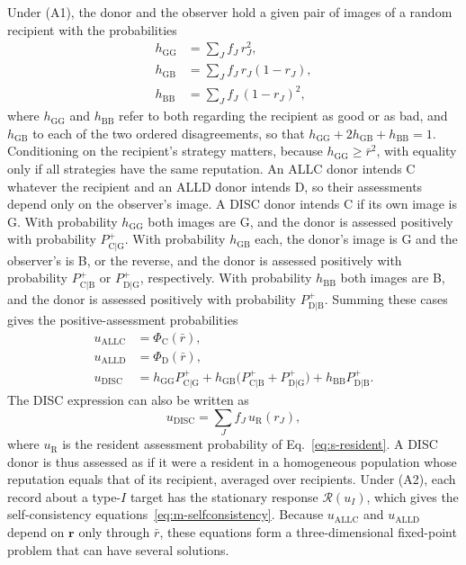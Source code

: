 \documentclass[10pt]{wlscirep}
\newcommand{\Rmap}{\mathscr{R}}            %
\newcommand{\Pp}[1]{P^{+}_{\mathrm{#1}}}   %
\newcommand{\PhiC}{\Phi_{\mathrm{C}}}
\newcommand{\PhiD}{\Phi_{\mathrm{D}}}
\newcommand{\ALLC}{\mathrm{ALLC}}
\newcommand{\ALLD}{\mathrm{ALLD}}
\newcommand{\DISC}{\mathrm{DISC}}
\theoremstyle{plain}
\theoremstyle{remark}
\begin{document}
Under (A1), the donor and the observer hold a given pair of images of a random recipient with the probabilities
\begin{equation}
\begin{aligned}
h_{\mathrm{GG}}&=\sum_Jf_J\,r_J^2,\\
h_{\mathrm{GB}}&=\sum_Jf_J\,r_J(1-r_J),\\
h_{\mathrm{BB}}&=\sum_Jf_J\,(1-r_J)^2,
\end{aligned}
\label{eq:s-h}
\end{equation}
where $h_{\mathrm{GG}}$ and $h_{\mathrm{BB}}$ refer to both regarding the recipient as good or as bad, and $h_{\mathrm{GB}}$ to each of the two ordered disagreements, so that $h_{\mathrm{GG}}+2h_{\mathrm{GB}}+h_{\mathrm{BB}}=1$. Conditioning on the recipient's strategy matters, because $h_{\mathrm{GG}}\geq\bar r^2$, with equality only if all strategies have the same reputation. An ALLC donor intends C whatever the recipient and an ALLD donor intends D, so their assessments depend only on the observer's image. A DISC donor intends C if its own image is G. With probability $h_{\mathrm{GG}}$ both images are G, and the donor is assessed positively with probability $\Pp{C|G}$. With probability $h_{\mathrm{GB}}$ each, the donor's image is G and the observer's is B, or the reverse, and the donor is assessed positively with probability $\Pp{C|B}$ or $\Pp{D|G}$, respectively. With probability $h_{\mathrm{BB}}$ both images are B, and the donor is assessed positively with probability $\Pp{D|B}$. Summing these cases gives the positive-assessment probabilities
\begin{equation}
\begin{aligned}
u_{\ALLC}&=\PhiC(\bar r),\\
u_{\ALLD}&=\PhiD(\bar r),\\
u_{\DISC}&=h_{\mathrm{GG}}\Pp{C|G}+h_{\mathrm{GB}}\bigl(\Pp{C|B}+\Pp{D|G}\bigr)+h_{\mathrm{BB}}\Pp{D|B}.
\end{aligned}
\label{eq:s-u}
\end{equation}
The DISC expression can also be written as
\begin{equation}
u_{\DISC}=\sum_Jf_J\,u_{\mathrm R}(r_J),
\label{eq:s-udisc}
\end{equation}
where $u_{\mathrm R}$ is the resident assessment probability of Eq.~\eqref{eq:s-resident}. A DISC donor is thus assessed as if it were a resident in a homogeneous population whose reputation equals that of its recipient, averaged over recipients. Under (A2), each record about a type-$I$ target has the stationary response $\Rmap(u_I)$, which gives the self-consistency equations~\eqref{eq:m-selfconsistency}. Because $u_{\ALLC}$ and $u_{\ALLD}$ depend on $\bm r$ only through $\bar r$, these equations form a three-dimensional fixed-point problem that can have several solutions.
\end{document}
